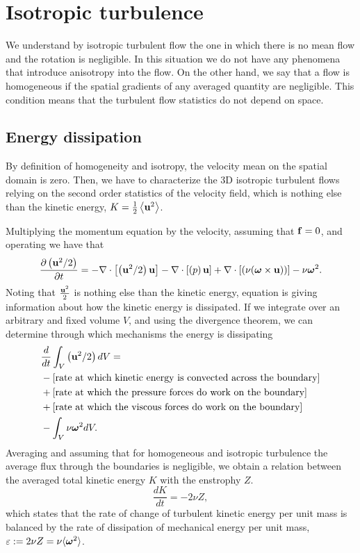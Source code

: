 \section{Isotropic turbulence}
\label{sec-isotropic_turbulence}
We understand by isotropic turbulent flow the one in which there is no mean flow and the rotation is negligible. In this situation we do not have any phenomena that introduce anisotropy into the flow. On the other hand, we say that a flow is homogeneous if the spatial gradients of any averaged quantity are negligible. This condition means that the turbulent flow statistics do not depend on space.

\subsection{Energy dissipation}
\label{subsec-isotropic_energy_dissipation}
By definition of homogeneity and isotropy, the velocity mean on the spatial domain is zero. Then, we have to characterize the 3D isotropic turbulent flows relying on the second order statistics of the velocity field, which is nothing else than the kinetic energy, $K=\frac{1}{2}\left\langle{\bf u}^2\right\rangle$.

Multiplying the momentum equation  by the velocity, assuming that ${\bf f}=0$, and operating we have that
\begin{equation}
\label{eq-energy_equation}
\frac{\partial\left({\bf u}^2/2\right)}{\partial t}=-\nabla\cdot\left[\left({\bf u}^2/2\right){\bf u}\right]-\nabla\cdot\left[\left(p\right){\bf u}\right]+\nabla\cdot\left[\left(\nu(\boldsymbol{\omega}\times{\bf u})\right)\right]-\nu\boldsymbol{\omega}^2.
\end{equation}
Noting that $\frac{{\bf u}^2}{2}$ is nothing else than the kinetic energy, equation  is giving information about how the kinetic energy is dissipated. If we integrate  over an arbitrary and fixed volume $V$, and using the divergence theorem, we can determine through which mechanisms the energy is dissipating
\begin{align}
\label{eq-energy_dissipation}
&\frac{d}{dt}\int_V\left({\bf u}^2/2\right)dV=\\\nonumber
&-\left[\mbox{rate at which kinetic energy is convected across the boundary}\right]\\\nonumber
&+\left[\mbox{rate at which the pressure forces do work on the boundary}\right]\\\nonumber
&+\left[\mbox{rate at which the viscous forces do work on the boundary}\right]\\\nonumber
&-\int_V\nu\boldsymbol{\omega}^2dV.
\end{align}
Averaging  and assuming that for homogeneous and isotropic turbulence the average flux through the boundaries is negligible, we obtain a relation between the averaged total kinetic energy $K$ with the enstrophy $Z$.
\begin{equation}
\label{eq-energy_enstrophy}
\frac{d K}{dt}=-2\nu Z,
\end{equation}
which states that the rate of change of turbulent kinetic energy per unit mass is balanced by the rate of dissipation of mechanical energy per unit mass, $\varepsilon:=2\nu Z=\nu\langle\boldsymbol{\omega}^2\rangle$.

